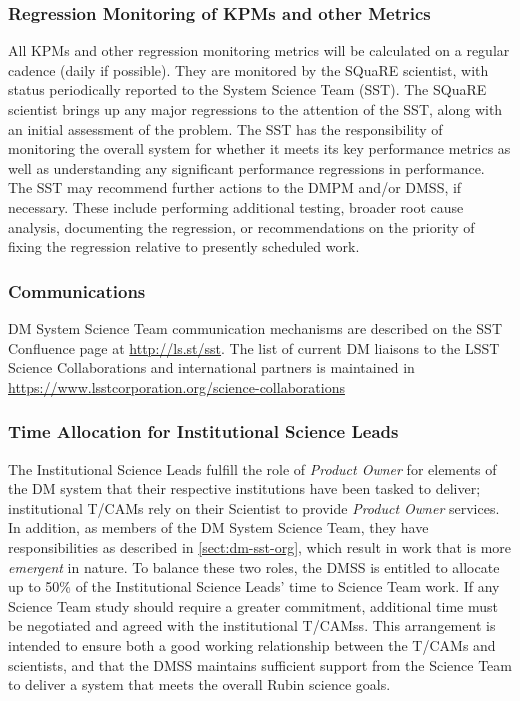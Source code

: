 \subsubsection{Regression Monitoring of KPMs and other Metrics}

All KPMs and other regression monitoring metrics will be calculated on a regular cadence (daily if possible).
They are monitored by the SQuaRE scientist, with status periodically reported to the System Science Team (SST).
The SQuaRE scientist brings up any major regressions to the attention of the SST, along with an initial assessment of the problem.
The SST has the responsibility of monitoring the overall system for whether it meets its key performance metrics as well as understanding any significant performance regressions in performance.
The SST may recommend further actions to the \gls{DMPM} and/or \gls{DMSS}, if necessary.
These include performing additional testing, broader root cause analysis, documenting the regression, or recommendations on the priority of fixing the regression relative to presently scheduled work.

\subsubsection{Communications}

DM System Science Team communication mechanisms are described on the SST Confluence page at \url{http://ls.st/sst}. The list of current  DM liaisons to the LSST Science Collaborations and international partners is maintained  in  \url{https://www.lsstcorporation.org/science-collaborations}

\subsubsection{Time Allocation for Institutional Science Leads}

The Institutional Science Leads fulfill the role of \textit{Product Owner} for elements of the DM system that their respective institutions have been tasked to deliver; institutional T/CAMs rely on their Scientist to provide  \emph{Product Owner}  services.
In addition, as members of the DM System Science Team, they have responsibilities as described in \ref{sect:dm-sst-org}, which result in work that is more \textit{emergent} in nature.
To balance these two roles, the \gls{DMSS} is entitled to allocate up to 50\% of the Institutional Science Leads' time to Science Team work.
If any Science Team study should require a greater commitment, additional time must be negotiated and agreed with the institutional \glspl{T/CAM}s.
This arrangement is intended to ensure both a good working relationship between the T/CAMs and scientists, and that the \gls{DMSS} maintains sufficient support from the Science Team to deliver a system that meets the overall Rubin science goals.

